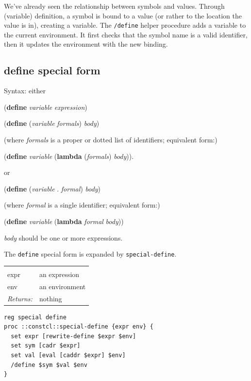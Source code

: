 \documentclass[twoside,9pt]{report}
\begin{document}
We've already seen the relationship between symbols and values. Through (variable) definition, a symbol is bound to a value (or rather to the location the value is in), creating a variable. The \texttt{/define} helper procedure adds a variable to the current environment. It first checks that the symbol name is a valid identifier, then it updates the environment with the new binding.

\subsection{define special form}
\label{define-special-form}


Syntax: either


(\textbf{define} \emph{variable} \emph{expression})


(\textbf{define} (\emph{variable} \emph{formals}) \emph{body})


(where \emph{formals} is a proper or dotted list of identifiers; equivalent form:)


(\textbf{define} \emph{variable} (\textbf{lambda} (\emph{formals}) \emph{body})).


or


(\textbf{define} (\emph{variable} . \emph{formal}) \emph{body})


(where \emph{formal} is a single identifier; equivalent form:)


(\textbf{define} \emph{variable} (\textbf{lambda} \emph{formal} \emph{body}))


\emph{body} should be one or more expressions.


The \texttt{define} special form is expanded by \texttt{special-define}.

\noindent\begin{tabular}{ |p{1.9cm} p{8cm}| }
\hline
\rowcolor[HTML]{CCCCCC} \multicolumn{2}{|l|}{\bf special-define (internal)} \\
expr & an expression \\
env & an environment \\
\textit{Returns:} & nothing \\
\hline
\end{tabular}
\begin{lstlisting}
reg special define
proc ::constcl::special-define {expr env} {
  set expr [rewrite-define $expr $env]
  set sym [cadr $expr]
  set val [eval [caddr $expr] $env]
  /define $sym $val $env
}
\end{lstlisting}
\end{document}
